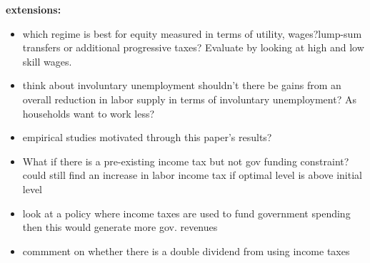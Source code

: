 \textbf{extensions:}
\begin{itemize}
	\item which  regime is best for equity measured in terms of utility, wages?lump-sum transfers or additional progressive taxes? \ar Evaluate by looking at high and low skill wages. 
	\item think about involuntary unemployment \ar shouldn't there be gains from an overall reduction in labor supply in terms of involuntary unemployment? As households want to work less?
	\item empirical studies motivated through this paper's results?
	\item  What if there is a pre-existing income tax but not gov funding constraint? could still find an increase in labor income tax if optimal level is above initial level
	\item  look at a policy where income taxes are used to fund government spending \ar then this would generate more gov. revenues
	\item commment on whether there is a double dividend from using income taxes
\end{itemize}
\begin{comment}
\paragraph{Extension: What if the low skilled get a higher share \ar they reduce even less \ar more fossil input supply}

Redistribution to households with a higher marginal propensity to consume emissions counteracts the externality. This effect is amplified by a market size effect  of dirty goods. 

content...
\end{comment}


